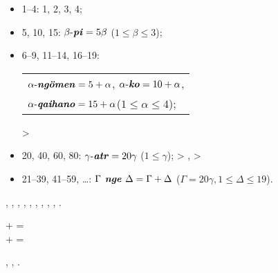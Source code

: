 \solution
%
\begin{itemize}
\item 1--4:
 1,
 2,
 3,
 4;
\item 5, 10, 15: $\beta\mbox{-\bord{pi}} = 5\beta$ ($1\le\beta\le3$);
\item 6--9, 11--14, 16--19:
\begin{tabular}[t]{@{}l}$\alpha\mbox{-\bord{ngömen}} = 5+\alpha$, $\alpha\mbox{-\bord{ko}} = 10+\alpha$,\\
$\alpha\mbox{-\bord{qaihano}} = 15+\alpha$\hfill ($1\le\alpha\le4$);
\end{tabular}
\hfill {} > 


\item 20, 40, 60, 80: $\gamma\mbox{-\bord{atr}} = 20\gamma$ ($1\le\gamma$);\hfill
{} > ,  > 
\item 21--39, 41--59, \dots: $\Gamma\mbox{\bord{ nge }} \Delta = \Gamma+\Delta$ ($\Gamma=20\gamma, 1\le\Delta\le19$).
\end{itemize}
%
\begin{assgts}
\item {}, , , , , , , , , .
\item
%
\begin{flushleft}
 +  =  \\
 +  = 
\end{flushleft}
%
\item {}, , .
\end{assgts}

